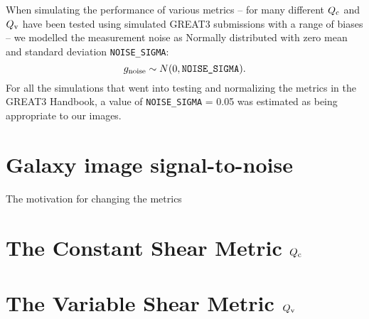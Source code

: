 \documentclass[preprint,11pt]{aastex}
\begin{document}
When simulating the performance of various metrics -- for many different
$Q_{\rm c}$ and $Q_{\rm v}$ have been tested using simulated GREAT3
submissions with a range of biases -- we modelled the measurement
noise as Normally distributed with zero mean and standard deviation \texttt{NOISE\_SIGMA}:
\begin{equation}
g_{\rm noise} \sim N(0, \texttt{NOISE\_SIGMA}).
\end{equation}
For all the simulations that went into testing and normalizing the
metrics in the GREAT3 Handbook, a value of \texttt{NOISE\_SIGMA} =
0.05 was estimated as being appropriate to our images.

\section{Galaxy image signal-to-noise}\label{sec:snr}
The motivation for changing the metrics

\section{The Constant Shear Metric $Q_{\rm c}$}\label{sec:qc}

\section{The Variable Shear Metric $Q_{\rm v}$}\label{sec:qv}
\end{document}
